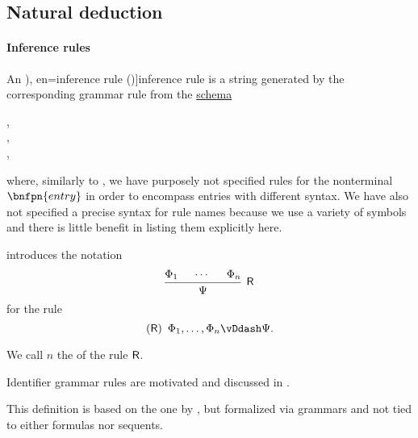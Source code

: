 \subsection{Natural deduction}\label{subsec:natural_deduction}

\paragraph{Inference rules}

\begin{definition}\label{def:inference_rule}\mimprovised
  An \term[ru=правило вывода (\cite[31]{Герасимов2011Вычислимость}), en=inference rule (\cite[2]{MartinLof1996Meanings})]{inference rule} is a string generated by the corresponding grammar rule from the \hyperref[def:formal_grammar/schema]{schema}
  \begin{bnf*}
         { \bnfor {} \bnfsp \bnftsq{,} \bnfsp {}}, \\
           {\bnfes \bnfor {} \bnfor {}}, \\
         {}, \\
     {\bnftsq{(} \bnfsp {} \bnfsp \bnftsq{)} \bnfsp {} \bnfsp \bnftsq{\( \vDdash \)} \bnfsp {}}
  \end{bnf*}
  where, similarly to , we have purposely not specified rules for the nonterminal \( \bnfpn{entry} \) in order to encompass entries with different syntax. We have also not specified a precise syntax for rule names because we use a variety of symbols and there is little benefit in listing them explicitly here.

   introduces the notation
  \begin{equation*}
    \begin{prooftree}
      \hypo{ \Phi_1 }
      \hypo{ \cdots }
      \hypo{ \Phi_n }
      \infer3[\logic{R}]{ \Psi }
    \end{prooftree}
  \end{equation*}
  for the rule
  \begin{equation*}
    (\logic{R}) \enspace \Phi_1, \ldots, \Phi_n \vDdash \Psi.
  \end{equation*}

  We call \( n \) the  of the rule \( \textsf{R} \).
\end{definition}
\begin{comments}
  \item Identifier grammar rules are motivated and discussed in .
  \item This definition is based on the one by , but formalized via grammars and not tied to either formulas nor sequents.
\end{comments}

